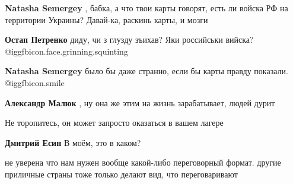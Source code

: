 \begin{itemize}
\begin{itemize}
\textbf{Natasha Semergey} , бабка, а что твои карты говорят, есть ли войска РФ на территории Украины? Давай-ка, раскинь карты, и мозги

\textbf{Остап Петренко} диду, чи з глузду зъихав? Яки российськи вийска? @igg{fbicon.face.grinning.squinting} 

\textbf{Natasha Semergey} было бы даже странно, если бы карты правду показали.  @igg{fbicon.smile} 

\textbf{Александр Малюк} , ну она же этим на жизнь зарабатывает, людей дурит

\end{itemize} %

Не торопитесь, он может запросто оказаться в вашем лагере

\textbf{Дмитрий Есин} В моём, это в каком?


не уверена что нам нужен вообще какой-либо переговорный формат. другие
приличные страны тоже только делают вид, что переговаривают

\end{itemize} %
